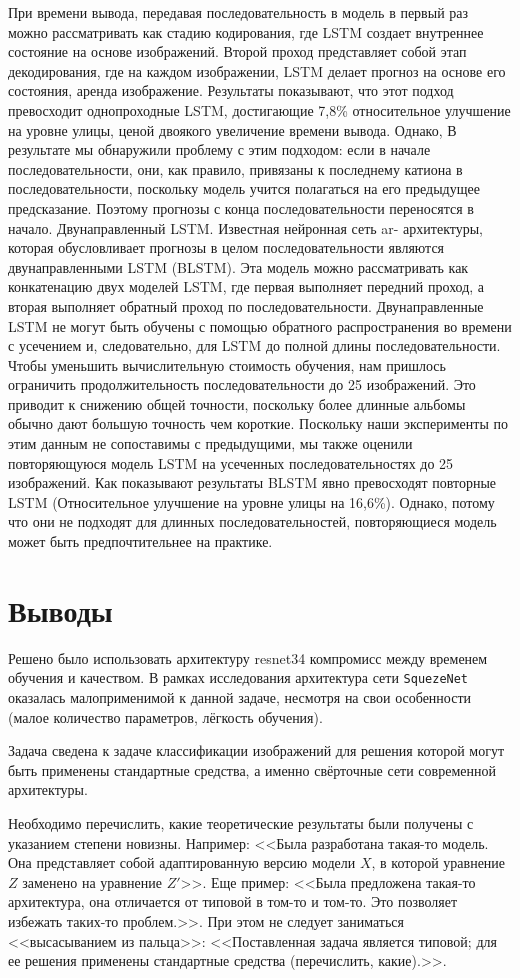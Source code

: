 При времени вывода, передавая последовательность в модель
в первый раз можно рассматривать как стадию кодирования, где
LSTM создает внутреннее состояние на основе изображений.
Второй проход представляет собой этап декодирования, где на каждом изображении,
LSTM делает прогноз на основе его состояния,
аренда изображение. Результаты показывают, что этот подход превосходит
однопроходные LSTM, достигающие 7,8\%
относительное улучшение на уровне улицы, ценой двоякого
увеличение времени вывода. Однако,
В результате мы обнаружили проблему с этим подходом:
если в начале последовательности, они, как правило, привязаны к последнему
катиона в последовательности, поскольку модель учится полагаться на
его предыдущее предсказание. Поэтому прогнозы с конца
последовательности переносятся в начало.
Двунаправленный LSTM. Известная нейронная сеть ar-
архитектуры, которая обусловливает прогнозы в целом
последовательности являются двунаправленными LSTM (BLSTM). Эта модель можно рассматривать как конкатенацию двух моделей LSTM, где первая выполняет передний проход, а вторая выполняет обратный проход по последовательности. Двунаправленные LSTM не могут быть обучены с помощью обратного распространения во времени с усечением и, следовательно, для LSTM до полной длины последовательности. Чтобы уменьшить
вычислительную стоимость обучения, нам пришлось ограничить продолжительность
последовательности до 25 изображений. Это приводит к снижению общей
точности, поскольку более длинные альбомы обычно дают
большую точность чем короткие. Поскольку наши эксперименты по этим данным
не сопоставимы с предыдущими, мы также
оценили повторяющуюся модель LSTM на усеченных последовательностях
до 25 изображений. Как показывают результаты BLSTM явно превосходят повторные LSTM
(Относительное улучшение на уровне улицы на 16,6\%). Однако,
потому что они не подходят для длинных последовательностей, повторяющиеся модель может быть предпочтительнее на практике.


\section{Выводы}

Решено было использовать архитектуру resnet34 компромисс между временем обучения и качеством. В рамках исследования архитектура сети \texttt{SquezeNet} оказалась малоприменимой к данной задаче, несмотря на свои особенности (малое количество параметров, лёгкость обучения).

Задача сведена к задаче классификации изображений для решения которой могут быть 
применены стандартные средства, а именно свёрточные сети современной архитектуры.

Необходимо перечислить, какие теоретические результаты были получены с 
указанием степени новизны. Например: <<Была разработана такая-то модель. Она 
представляет собой адаптированную версию модели $X$, в которой уравнение $Z$ 
заменено на уравнение $Z'$>>. Еще пример: <<Была предложена такая-то 
архитектура, она отличается от типовой в том-то и том-то. Это позволяет 
избежать таких-то проблем.>>. При этом не следует заниматься <<высасыванием из 
пальца>>: <<Поставленная задача является типовой; для ее решения применены 
стандартные средства (перечислить, какие).>>.
